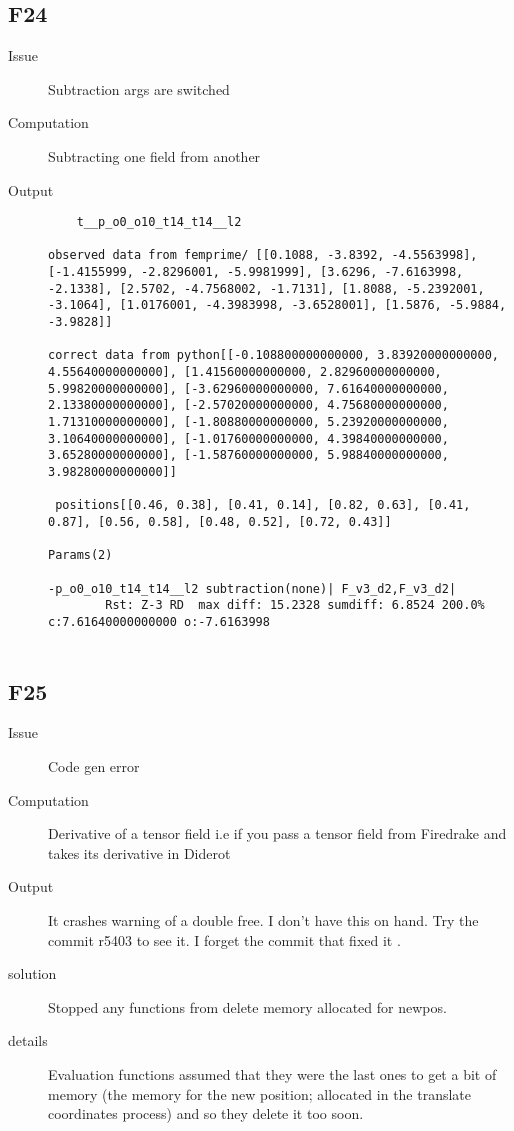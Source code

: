 \subsection{F24}

\begin{description}
\item[Issue] Subtraction args are switched
\item[Computation] Subtracting one field from another
\item[Output]
  \begin{lstlisting}
    t__p_o0_o10_t14_t14__l2

observed data from femprime/ [[0.1088, -3.8392, -4.5563998], [-1.4155999, -2.8296001, -5.9981999], [3.6296, -7.6163998, -2.1338], [2.5702, -4.7568002, -1.7131], [1.8088, -5.2392001, -3.1064], [1.0176001, -4.3983998, -3.6528001], [1.5876, -5.9884, -3.9828]]

correct data from python[[-0.108800000000000, 3.83920000000000, 4.55640000000000], [1.41560000000000, 2.82960000000000, 5.99820000000000], [-3.62960000000000, 7.61640000000000, 2.13380000000000], [-2.57020000000000, 4.75680000000000, 1.71310000000000], [-1.80880000000000, 5.23920000000000, 3.10640000000000], [-1.01760000000000, 4.39840000000000, 3.65280000000000], [-1.58760000000000, 5.98840000000000, 3.98280000000000]]

 positions[[0.46, 0.38], [0.41, 0.14], [0.82, 0.63], [0.41, 0.87], [0.56, 0.58], [0.48, 0.52], [0.72, 0.43]]

Params(2)

-p_o0_o10_t14_t14__l2 subtraction(none)| F_v3_d2,F_v3_d2| 
		Rst: Z-3 RD  max diff: 15.2328 sumdiff: 6.8524 200.0% c:7.61640000000000 o:-7.6163998


  \end{lstlisting}
\end{description}

\subsection{F25}

\begin{description}
\item[Issue] Code gen error
\item[Computation] Derivative of a tensor field i.e if you pass a tensor field from Firedrake and takes its derivative in Diderot
\item[Output]  It crashes warning of a double free. I don't have this on hand. Try the commit r5403 to see it. I forget the commit that fixed it
.\item[solution] Stopped any functions from delete memory allocated for newpos.
\item[details] Evaluation functions assumed that they were the last ones to get a bit of memory (the memory for the new position; allocated in the translate coordinates process) and so they delete it too soon.

\end{description}

